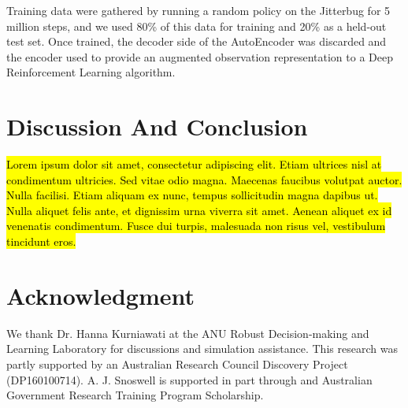 \documentclass[letterpaper, 10 pt, conference]{ieeeconf}
\begin{document}
Training data were gathered by running a random policy on the Jitterbug for 5 million steps, and we used 80\% of this data for training and 20\% as a held-out test set.
Once trained, the decoder side of the AutoEncoder was discarded and the encoder used to provide an augmented observation representation to a Deep Reinforcement Learning algorithm.

\section{Discussion And Conclusion}

\hl{Lorem ipsum dolor sit amet, consectetur adipiscing elit. Etiam ultrices nisl at condimentum ultricies. Sed vitae odio magna. Maecenas faucibus volutpat auctor. Nulla facilisi. Etiam aliquam ex nunc, tempus sollicitudin magna dapibus ut. Nulla aliquet felis ante, et dignissim urna viverra sit amet. Aenean aliquet ex id venenatis condimentum. Fusce dui turpis, malesuada non risus vel, vestibulum tincidunt eros.}



\section*{Acknowledgment}

We thank Dr. Hanna Kurniawati at the ANU Robust Decision-making and Learning Laboratory for discussions and simulation assistance.
This research was partly supported by an Australian Research Council Discovery Project (DP160100714).
A. J. Snoswell is supported in part through and Australian Government Research Training Program Scholarship. 




\end{document}
